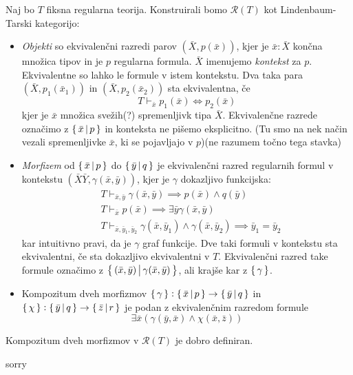 \documentclass[../kategoricna_logika.tex]{subfiles}
\begin{document}
\begin{definicija}
  Naj bo $T$ fiksna regularna teorija. Konstruirali bomo $\mathcal{R}(T)$ kot Lindenbaum-Tarski kategorijo:
  \begin{itemize}
    \item \emph{Objekti} so ekvivalenčni razredi parov $(\bar{X}, p(\bar{x}))$,
      kjer je $\bar{x} : \bar{X}$ končna množica tipov in je $p$ regularna formula.
      $\bar{X}$ imenujemo \emph{kontekst} za $p$. Ekvivalentne so lahko le formule v istem kontekstu.
      Dva taka para $(\bar{X}, p_1(\bar{x}_1))$ in $(\bar{X}, p_2(\bar{x}_2))$ sta ekvivalentna, če
      $$T \vdash_{\bar{x}} p_1(\bar{x}) \Leftrightarrow p_2(\bar{x})$$
      kjer je $\bar{x}$ množica svežih(?) spremenljivk tipa $\bar{X}$.
      Ekvivalenčne razrede označimo z $\left\lbrace\,\bar{x} \,\middle|\, p\,\right\rbrace$ in konteksta ne pišemo eksplicitno.
      (Tu smo na nek način vezali spremenljivke $\bar{x}$, ki se pojavljajo v $p$)(ne razumem točno tega stavka)
    \item \emph{Morfizem} od $\left\lbrace\,\bar{x} \,\middle|\, p\,\right\rbrace$ do $\left\lbrace\,\bar{y} \,\middle|\, q\,\right\rbrace$
      je ekvivalenčni razred regularnih formul v kontekstu $(\bar{X}\bar{Y}, \gamma(\bar{x},\bar{y}))$,
      kjer je $\gamma$ dokazljivo funkcijska:
      \begin{align*}
        &T \vdash_{\bar{x},\bar{y}} \gamma(\bar{x},\bar{y})  \implies p(\bar{x}) \wedge q(\bar{y}) \\
        &T \vdash_{\bar{x}} p(\bar{x}) \implies \exists \bar{y} \gamma(\bar{x},\bar{y}) \\
        &T \vdash_{\bar{x},\bar{y}_1,\bar{y}_2} \gamma(\bar{x},\bar{y}_1) \wedge \gamma(\bar{x},\bar{y}_2) \implies \bar{y}_1 = \bar{y}_2
      \end{align*}
      kar intuitivno pravi, da je $\gamma$ graf funkcije. Dve taki formuli v kontekstu sta ekvivalentni, če sta dokazljivo ekvivalentni v $T$.
      Ekvivalenčni razred take formule označimo z $\left\lbrace\,(\bar{x},\bar{y}) \,\middle|\, \gamma(\bar{x},\bar{y})\,\right\rbrace$, ali krajše kar z $\left\lbrace\,\gamma\,\right\rbrace$.
    \item Kompozitum dveh morfizmov $\left\lbrace\,\gamma\,\right\rbrace : \left\lbrace\,\bar{x} \,\middle|\, p\,\right\rbrace \to \left\lbrace\,\bar{y} \,\middle|\, q\,\right\rbrace$ in
      $\left\lbrace\,\chi\,\right\rbrace : \left\lbrace\,\bar{y}\,\middle|\, q\,\right\rbrace \to \left\lbrace\,\bar{z}\,\middle|\, r\,\right\rbrace$ je podan z ekvivalenčnim razredom formule
      $$\exists \bar{x}(\gamma(\bar{y},\bar{x}) \wedge \chi(\bar{x},\bar{z}))$$
  \end{itemize}
\end{definicija}
\begin{lema}
  Kompozitum dveh morfizmov v $\mathcal{R}(T)$ je dobro definiran.
\end{lema}
\begin{dokaz}
  sorry
\end{dokaz}
\end{document}
